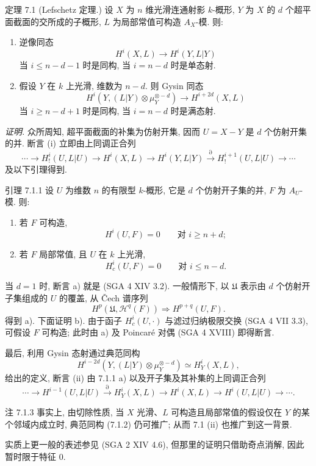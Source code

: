\begin{statement}{定理 7.1}
(Lefschetz 定理.) 设 $X$ 为 $n$ 维光滑连通射影 $k$-概形, $Y$ 为 $X$ 的 $d$ 个超平面截面的交所成的子概形, $L$ 为局部常值可构造 $A_X$-模. 则:
\begin{enumerate}[label=(\roman*)]
\item 逆像同态
\[
H^i(X,L)\to H^i(Y,L|Y)
\]
当 $i\le n-d-1$ 时是同构, 当 $i=n-d$ 时是单态射.
\item 假设 $Y$ 在 $k$ 上光滑, 维数为 $n-d$. 则 Gysin 同态
\[
H^i(Y,(L|Y)\otimes\mu_Y^{\otimes -d})\to H^{i+2d}(X,L)
\]
当 $i\ge n-d+1$ 时是同构, 当 $i=n-d$ 时是满态射.
\end{enumerate}
\end{statement}

\emph{证明.} 众所周知, 超平面截面的补集为仿射开集, 因而 $U=X-Y$ 是 $d$ 个仿射开集的并. 断言 (i) 立即由上同调正合列
\[
\cdots\to H_!^i(U,L|U)\to H^i(X,L)\to H^i(Y,L|Y)
\xrightarrow{\partial} H_!^{i+1}(U,L|U)\to\cdots
\]
及以下引理得到.

\begin{statement}{引理 7.1.1}
设 $U$ 为维数 $n$ 的有限型 $k$-概形, 它是 $d$ 个仿射开子集的并, $F$ 为 $A_U$-模. 则:
\begin{enumerate}[label=\alph*)]
\item 若 $F$ 可构造,
\[
H^i(U,F)=0\qquad\text{对 }i\ge n+d;
\]
\item 若 $F$ 局部常值, 且 $U$ 在 $k$ 上光滑,
\[
H^i_c(U,F)=0\qquad\text{对 }i\le n-d.
\]
\end{enumerate}
\end{statement}

当 $d=1$ 时, 断言 a) 就是 (SGA 4 XIV 3.2). 一般情形下, 以 $\mathfrak U$ 表示由 $d$ 个仿射开子集组成的 $U$ 的覆盖, 从 Čech 谱序列
\[
H^p(\mathfrak U,\mathcal H^q(F))\Rightarrow H^{p+q}(U,F).
\]
得到 a). 下面证明 b). 由于函子 $H_c^i(U,\cdot)$ 与滤过归纳极限交换 (SGA 4 VII 3.3), 可假设 $F$ 可构造; 此时由 a) 及 Poincaré 对偶 (SGA 4 XVIII) 即得断言.

最后, 利用 Gysin 态射通过典范同构
\[
H^{i-2d}(Y,(L|Y)\otimes\mu_Y^{\otimes -d})\simeq H^i_Y(X,L),
\tag{7.1.2}
\]
给出的定义, 断言 (ii) 由 7.1.1 a) 以及开子集及其补集的上同调正合列
\[
\cdots\to H^{i-1}(U,L|U)\xrightarrow{\partial}H^i_Y(X,L)\to H^i(X,L)\to H^i(U,L|U)\to\cdots .
\]

\begin{statement}{注 7.1.3}
事实上, 由切除性质, 当 $X$ 光滑、$L$ 可构造且局部常值的假设仅在 $Y$ 的某个邻域内成立时, 典范同构 (7.1.2) 仍可推广; 从而 7.1 (ii) 也推广到这一背景.

实质上更一般的表述参见 (SGA 2 XIV 4.6), 但那里的证明只借助奇点消解, 因此暂时限于特征 $0$.
\end{statement}

